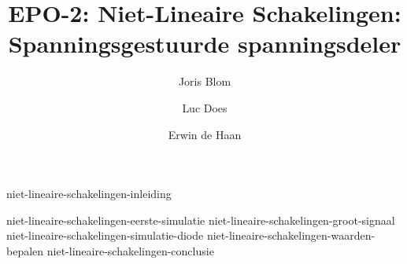 \documentclass{report}
\title{EPO-2: Niet-Lineaire Schakelingen: Spanningsgestuurde spanningsdeler}
\author{Joris Blom \and Luc Does \and Erwin de Haan}
\begin{document}
\maketitle
\newpage
{}

{niet-lineaire-schakelingen-inleiding}
\tableofcontents

\newpage
{}

{niet-lineaire-schakelingen-eerste-simulatie}
{niet-lineaire-schakelingen-groot-signaal}
{niet-lineaire-schakelingen-simulatie-diode}
{niet-lineaire-schakelingen-waarden-bepalen}
{niet-lineaire-schakelingen-conclusie}


\printbibliography
\end{document}
